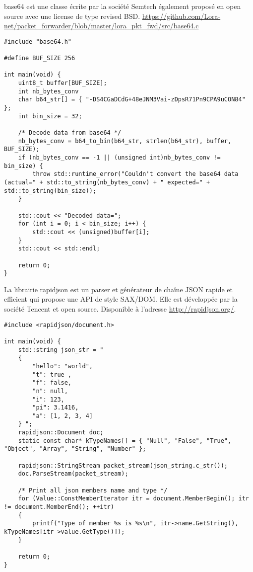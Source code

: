 base64 est une classe écrite par la société Semtech également proposé en open source avec une license de type revised BSD. \url{https://github.com/Lora-net/packet_forwarder/blob/master/lora_pkt_fwd/src/base64.c}

\begin{lstlisting}[style=CStyle]
#include "base64.h"

#define BUF_SIZE 256

int main(void) {
	uint8_t buffer[BUF_SIZE];
	int nb_bytes_conv
	char b64_str[] = { "-DS4CGaDCdG+48eJNM3Vai-zDpsR71Pn9CPA9uCON84" };
	int bin_size = 32;

	/* Decode data from base64 */
	nb_bytes_conv = b64_to_bin(b64_str, strlen(b64_str), buffer, BUF_SIZE);
	if (nb_bytes_conv == -1 || (unsigned int)nb_bytes_conv != bin_size) {
		throw std::runtime_error("Couldn't convert the base64 data (actual=" + std::to_string(nb_bytes_conv) + " expected=" + std::to_string(bin_size));
	}

	std::cout << "Decoded data=";
	for (int i = 0; i < bin_size; i++) {
		std::cout << (unsigned)buffer[i];
	}
	std::cout << std::endl;

	return 0;
}
\end{lstlisting}

La librairie rapidjson est un parser et générateur de chaîne JSON rapide et efficient qui propose une API de style SAX/DOM. Elle est développée par la société Tencent et open source. Disponible à l'adresse \url{http://rapidjson.org/}.

\begin{lstlisting}[style=CStyle]
#include <rapidjson/document.h>

int main(void) {
	std::string json_str = "
	{
    	"hello": "world",
    	"t": true ,
    	"f": false,
    	"n": null,
    	"i": 123,
    	"pi": 3.1416,
    	"a": [1, 2, 3, 4]
	} ";
	rapidjson::Document doc;
	static const char* kTypeNames[] = { "Null", "False", "True", "Object", "Array", "String", "Number" };
	
	rapidjson::StringStream packet_stream(json_string.c_str());
	doc.ParseStream(packet_stream);
	
	/* Print all json members name and type */
	for (Value::ConstMemberIterator itr = document.MemberBegin(); itr != document.MemberEnd(); ++itr)
	{
    	printf("Type of member %s is %s\n", itr->name.GetString(), kTypeNames[itr->value.GetType()]);
	}

	return 0;
}
\end{lstlisting}

